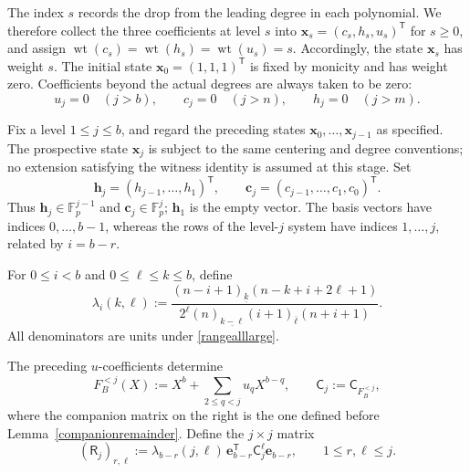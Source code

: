 \documentclass[12pt]{article}
\theoremstyle{remark}
\newcommand{\F}{\mathbb{F}_p}
\newcommand{\fall}[2]{(#1)_{\underline{#2}}}
\newcommand{\rise}[2]{(#1)_{\overline{#2}}}
\begin{document}
The index $s$ records the drop from the leading degree in each
polynomial.  We therefore collect the three coefficients at level $s$ into
$\mathbf x_s=(c_s,h_s,u_s)^{\mathsf T}$ for $s\ge0$, and assign
$\operatorname{wt}(c_s)=\operatorname{wt}(h_s)=\operatorname{wt}(u_s)=s$.
Accordingly, the state $\mathbf x_s$ has weight $s$.  The initial state
$\mathbf x_0=(1,1,1)^{\mathsf T}$ is fixed by monicity and has weight zero.  Coefficients beyond the
actual degrees are always taken to be zero:
\begin{equation}\label{actual_degree_conditions}
 u_j=0\quad(j>b),\qquad
 c_j=0\quad(j>n),\qquad
 h_j=0\quad(j>m).
\end{equation}

Fix a level $1\le j\le b$, and regard the preceding states
$\mathbf x_0,\ldots,\mathbf x_{j-1}$ as specified.  The prospective
state $\mathbf x_j$ is subject to the same centering and degree
conventions; no extension satisfying the witness identity is assumed at
this stage.  Set
\begin{equation*}
 \mathbf h_j=(h_{j-1},\ldots,h_1)^{\mathsf T},\qquad
 \mathbf c_j=(c_{j-1},\ldots,c_1,c_0)^{\mathsf T}.
\end{equation*}
Thus $\mathbf h_j\in\F^{j-1}$ and $\mathbf c_j\in\F^j$;
$\mathbf h_1$ is the empty vector.  The basis vectors have indices
$0,\ldots,b-1$, whereas the rows of the level-$j$ system have indices
$1,\ldots,j$, related by $i=b-r$.

For $0\le i<b$ and $0\le\ell\le k\le b$, define
\begin{equation}\label{lambda}
 \lambda_i(k,\ell):=
 \frac{\fall{n-i+1}{k}(n-k+i+2\ell+1)}
 {2^\ell\fall n{k-\ell}\rise{i+1}{\ell}(n+i+1)}.
\end{equation}
All denominators are units under \eqref{rangealllarge}.

The preceding $u$-coefficients determine
\begin{equation*}
 F_B^{<j}(X):=X^b+\sum_{2\le q<j}u_qX^{b-q},
 \qquad
 \mathsf C_j:=\mathsf C_{F_B^{<j}},
\end{equation*}
where the companion matrix on the right is the one defined before
Lemma~\ref{companionremainder}.  Define the $j\times j$ matrix
\begin{equation*}
 (\mathsf R_j)_{r,\ell}:=
 \lambda_{b-r}(j,\ell)\,
 \mathbf e_{b-r}^{\mathsf T}\mathsf C_j^\ell \mathbf e_{b-r},
 \qquad 1\le r,\ell\le j.
\end{equation*}
\end{document}
